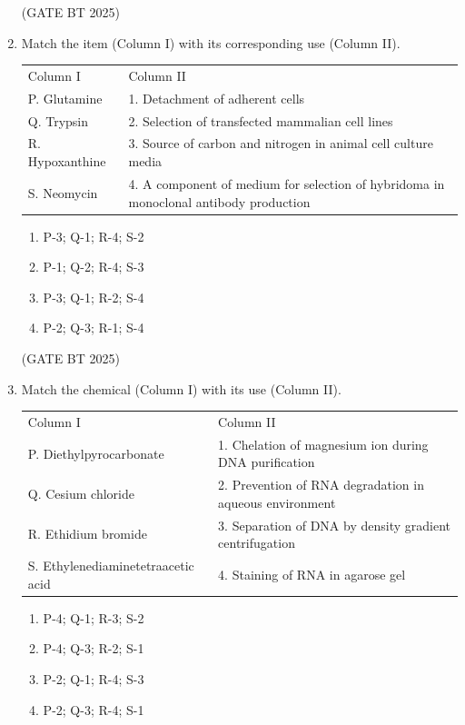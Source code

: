 \documentclass[journal,12pt,onecolumn]{IEEEtran}
\theoremstyle{remark}
\begin{document}
\begin{enumerate}
\hfill (GATE BT 2025)

\item Match the item (Column I) with its corresponding use (Column II).

\begin{tabular}{ll}
Column I & Column II \\
P. Glutamine & 1. Detachment of adherent cells \\
Q. Trypsin & 2. Selection of transfected mammalian cell lines \\
R. Hypoxanthine & 3. Source of carbon and nitrogen in animal cell culture media \\
S. Neomycin & 4. A component of medium for selection of hybridoma in monoclonal antibody production \\
\end{tabular}

\begin{enumerate}
\item P-3; Q-1; R-4; S-2 \hfill
\item P-1; Q-2; R-4; S-3 \hfill
\item P-3; Q-1; R-2; S-4 \hfill
\item P-2; Q-3; R-1; S-4
\end{enumerate}

\hfill (GATE BT 2025)

\item Match the chemical (Column I) with its use (Column II).

\begin{tabular}{ll}
Column I & Column II \\
P. Diethylpyrocarbonate & 1. Chelation of magnesium ion during DNA purification \\
Q. Cesium chloride & 2. Prevention of RNA degradation in aqueous environment \\
R. Ethidium bromide & 3. Separation of DNA by density gradient centrifugation \\
S. Ethylenediaminetetraacetic acid & 4. Staining of RNA in agarose gel \\
\end{tabular}

\begin{enumerate}
\item P-4; Q-1; R-3; S-2 \hfill
\item P-4; Q-3; R-2; S-1 \hfill
\item P-2; Q-1; R-4; S-3 \hfill
\item P-2; Q-3; R-4; S-1
\end{enumerate}


\end{enumerate}
\end{document}
